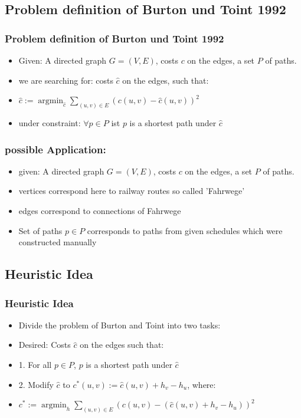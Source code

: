 \documentclass[
	11pt, %
]{beamer}
\begin{document}


\subsection{Problem definition of Burton und Toint 1992}
\begin{frame}
	\frametitle{Problem definition of Burton und Toint 1992}
	
	\begin{itemize}
	    \item Given: A directed graph $G = (V,E)$,  costs $c$ on the edges, a set $P$ of paths.
            \item we are searching for: costs $\hat{c}$ on the edges, such that:
            \item $\hat{c}:= \operatorname{argmin}_{\hat{c}} \sum_{(u,v)\in E} (c(u,v)-\hat{c}(u,v))^2$
            \item under constraint: $\forall p \in P$ ist $p$ is a shortest path under $\hat{c}$
	\end{itemize}

\end{frame}


\begin{frame}
	\frametitle{possible Application:}
	
	\begin{itemize}
	    \item given: A directed graph $G = (V,E)$,  costs $c$ on the edges, a set $P$ of paths.
            \item vertices correspond here to railway routes so called 'Fahrwege'
            \item edges correspond to connections of Fahrwege
            \item Set of paths $p \in P$ corresponds to paths from given schedules which were constructed manually
	\end{itemize}

\end{frame}

\subsection{Heuristic Idea}
\begin{frame}
	\frametitle{Heuristic Idea}
	
	\begin{itemize}
	    \item Divide the problem of Burton and Toint into two tasks:
            \item Desired: Costs $\hat{c}$ on the edges such that:
            \item 1. For all $p \in P$, $p$ is a shortest path under $\hat{c}$
            \item 2. Modify $\hat{c}$ to $c^*(u,v):= \hat{c}(u,v)+h_v-h_u$, where:
            \item  $c^*:=\operatorname{argmin}_{h} \sum_{(u,v)\in E} (c(u,v)-(\hat{c}(u,v)+h_v-h_u))^2$

	\end{itemize}

\end{frame}
\end{document}
